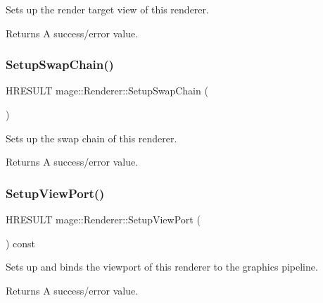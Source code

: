 Sets up the render target view of this renderer.

\begin{DoxyReturn}{Returns}
A success/error value. 
\end{DoxyReturn}
\hypertarget{classmage_1_1_renderer_af2aa545594936261bf2639e4e0814a83}{}\label{classmage_1_1_renderer_af2aa545594936261bf2639e4e0814a83} 
\subsubsection{\texorpdfstring{Setup\+Swap\+Chain()}{SetupSwapChain()}}
{\footnotesize\ttfamily H\+R\+E\+S\+U\+LT mage\+::\+Renderer\+::\+Setup\+Swap\+Chain (\begin{DoxyParamCaption}{ }\end{DoxyParamCaption})\hspace{0.3cm}{\ttfamily [protected]}}

Sets up the swap chain of this renderer.

\begin{DoxyReturn}{Returns}
A success/error value. 
\end{DoxyReturn}
\hypertarget{classmage_1_1_renderer_a18937e12912fe18b935893dc6502b92f}{}\label{classmage_1_1_renderer_a18937e12912fe18b935893dc6502b92f} 
\subsubsection{\texorpdfstring{Setup\+View\+Port()}{SetupViewPort()}}
{\footnotesize\ttfamily H\+R\+E\+S\+U\+LT mage\+::\+Renderer\+::\+Setup\+View\+Port (\begin{DoxyParamCaption}{ }\end{DoxyParamCaption}) const\hspace{0.3cm}{\ttfamily [protected]}}

Sets up and binds the viewport of this renderer to the graphics pipeline.

\begin{DoxyReturn}{Returns}
A success/error value. 
\end{DoxyReturn}
\hypertarget{classmage_1_1_renderer_a5fea21434ad2ac5bcd9ca09cf5f41852}{}\label{classmage_1_1_renderer_a5fea21434ad2ac5bcd9ca09cf5f41852} 
